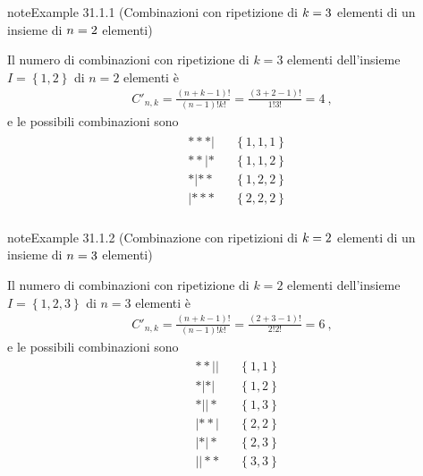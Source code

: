 \documentclass[letterpaper,10pt,italian]{jupyterBook}
\begin{document}
\begin{sphinxadmonition}{note}{Example 31.1.1 (Combinazioni con ripetizione di \protect\(k=3\protect\) elementi di un insieme di \protect\(n=2\protect\) elementi)}



\sphinxAtStartPar
Il numero di combinazioni con ripetizione di \(k=3\) elementi dell’insieme \(I = \left\{ 1, 2 \right\}\) di \(n=2\) elementi è
\begin{equation*}
\begin{split}C'_{n,k} = \frac{(n+k-1)!}{(n-1)! k!} = \frac{(3+2-1)!}{1!3!} = 4 \ ,\end{split}
\end{equation*}
\sphinxAtStartPar
e le possibili combinazioni sono
\begin{equation*}
\begin{split}\begin{aligned}
  &    \ast   \ast    \ast |  && \left\{  1,1,1 \right\} \\
  &    \ast   \ast |  \ast    && \left\{  1,1,2 \right\} \\
  &    \ast | \ast    \ast    && \left\{  1,2,2 \right\} \\
  & |  \ast   \ast    \ast    && \left\{  2,2,2 \right\} \\
\end{aligned}\end{split}
\end{equation*}\end{sphinxadmonition}
\label{ch/statistics/combinatorics:ex-combinations-with-rep-2}
\begin{sphinxadmonition}{note}{Example 31.1.2 (Combinazione con ripetizioni di \protect\(k=2\protect\) elementi di un insieme di \protect\(n=3\protect\) elementi)}



\sphinxAtStartPar
Il numero di combinazioni con ripetizione di \(k=2\) elementi dell’insieme \(I = \left\{ 1, 2, 3 \right\}\) di \(n=3\) elementi è
\begin{equation*}
\begin{split}C'_{n,k} = \frac{(n+k-1)!}{(n-1)! k!} = \frac{(2+3-1)!}{2!2!} = 6 \ ,\end{split}
\end{equation*}
\sphinxAtStartPar
e le possibili combinazioni sono
\begin{equation*}
\begin{split}\begin{aligned}
  &    \ast    \ast ||  && \left\{  1,1 \right\} \\
  &    \ast |  \ast |   && \left\{  1,2 \right\} \\
  &    \ast || \ast     && \left\{  1,3 \right\} \\
  &  | \ast    \ast |   && \left\{  2,2 \right\} \\
  &  | \ast |  \ast     && \left\{  2,3 \right\} \\
  & || \ast    \ast     && \left\{  3,3 \right\} \\
\end{aligned}\end{split}
\end{equation*}\end{sphinxadmonition}
\end{document}

